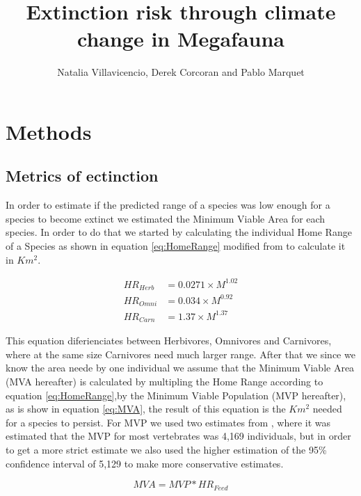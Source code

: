 \documentclass[]{article}
\title{Extinction risk through climate change in Megafauna}
\author{Natalia Villavicencio, Derek Corcoran and Pablo Marquet}
\date{}
\begin{document}
\maketitle

\hypertarget{methods}{%
\section{Methods}\label{methods}}

\hypertarget{metrics-of-ectinction}{%
\subsection{Metrics of ectinction}\label{metrics-of-ectinction}}

In order to estimate if the predicted range of a species was low enough for a species to become extinct we estimated the Minimum Viable Area for each species. In order to do that we started by calculating the individual Home Range of a Species as shown in equation \eqref{eq:HomeRange} modified from \citep{lindstedt1986home} to calculate it in \(Km^2\).

\begin{equation}
\begin{aligned}
  HR_{Herb} &= 0.0271 \times M^{1.02} \\
  HR_{Omni} &= 0.034\times M^{0.92} \\
  HR_{Carn} &= 1.37\times M^{1.37}
  \label{eq:HomeRange}
\end{aligned}
\end{equation}

This equation diferienciates between Herbivores, Omnivores and Carnivores, where at the same size Carnivores need much larger range. After that we since we know the area neede by one individual we assume that the Minimum Viable Area (MVA hereafter) is calculated by multipling the Home Range according to equation \eqref{eq:HomeRange},by the Minimum Viable Population (MVP hereafter), as is show in equation \eqref{eq:MVA}, the result of this equation is the \(Km^2\) needed for a species to persist. For MVP we used two estimates from \citep{traill2007minimum}, where it was estimated that the MVP for most vertebrates was 4,169 individuals, but in order to get a more strict estimate we also used the higher estimation of the 95\% confidence interval of 5,129 to make more conservative estimates.

\begin{equation}
  MVA = MVP*HR_{Feed}
  \label{eq:MVA}
\end{equation}
\end{document}
